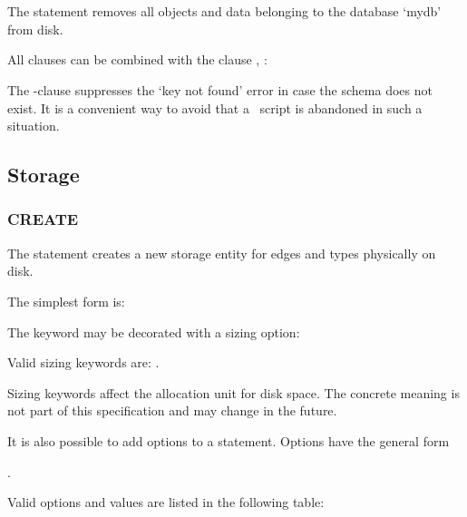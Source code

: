  \\
 \\
 

The statement removes all objects and data
belonging to the database `mydb' from disk.

All  clauses can be combined
with the clause , \eg:

  

The -clause
suppresses the `key not found' error
in case the schema
does not exist.
It is a convenient way to avoid
that a \sql\ script is abandoned
in such a situation.


\subsection{Storage}
\subsubsection{CREATE}
The  statement
creates a new storage entity for edges and types
physically on disk.

The simplest form is:

 

The keyword  may be decorated
with a sizing option:

 

Valid sizing keywords are:
.

Sizing keywords affect the allocation unit
for disk space. The concrete meaning is not
part of this specification and may change
in the future.

It is also possible to add options 
to a  statement.
Options have the general form

.

Valid options and values are listed in the following table:

